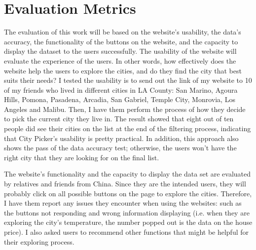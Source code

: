 \documentclass[10pt,twocolumn]{article}
\begin{document}
\section{Evaluation Metrics}
The evaluation of this work will be based on the website's usability, the data's accuracy, the functionality of the buttons on the website, and the capacity to display the dataset to the users successfully.
\newline
\indent
The usability of the website will evaluate the experience of the users. In other words, how effectively does the website help the users to explore the cities, and do they find the city that best suits their needs? I tested the usability is to send out the link of my website to 10 of my friends who lived in different cities in LA County: San Marino, Agoura Hills, Pomona, Pasadena, Arcadia, San Gabriel, Temple City, Monrovia, Los Angeles and Malibu. Then, I have them perform the process of how they decide to pick the current city they live in. The result showed that eight out of ten people did see their cities on the list at the end of the filtering process, indicating that City Picker's usability is pretty practical. In addition, this approach also shows the pass of the data accuracy test; otherwise, the users won't have the right city that they are looking for on the final list.

The website's functionality and the capacity to display the data set are evaluated by relatives and friends from China. Since they are the intended users, they will probably click on all possible buttons on the page to explore the cities. Therefore, I have them report any issues they encounter when using the websites: such as the buttons not responding and wrong information displaying (i.e. when they are exploring the city's temperature, the number popped out is the data on the house price). I also asked users to recommend other functions that might be helpful for their exploring process.
\end{document}
